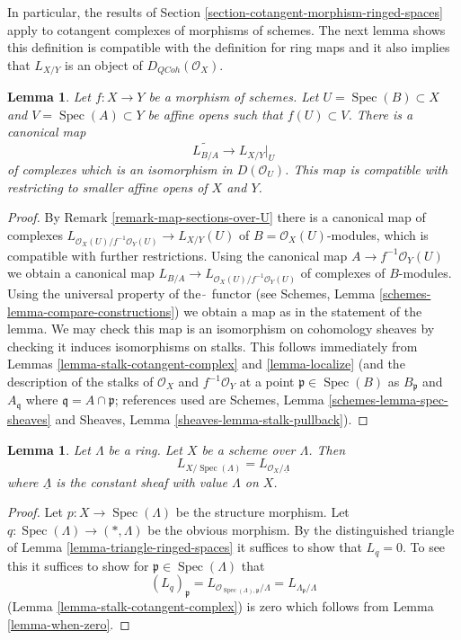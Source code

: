 \documentclass{stacks-project}
\theoremstyle{plain}
\newtheorem{lemma}[subsection]{Lemma}
\theoremstyle{definition}
\theoremstyle{remark}
\numberwithin{equation}{subsection}
\def\Spec{\mathop{\mathrm{Spec}}}
\def\QCoh{\mathit{QCoh}}
\begin{document}
\noindent
In particular, the results of
Section \ref{section-cotangent-morphism-ringed-spaces} apply
to cotangent complexes of morphisms of schemes.
The next lemma shows this definition is compatible with the definition
for ring maps and it also implies that $L_{X/Y}$ is an
object of $D_\QCoh(\mathcal{O}_X)$.

\begin{lemma}
\label{lemma-morphism-affine-schemes}
Let $f : X \to Y$ be a morphism of schemes. Let $U = \Spec(B) \subset X$
and $V = \Spec(A) \subset Y$ be affine opens such that $f(U) \subset V$.
There is a canonical map
$$
\widetilde{L_{B/A}} \longrightarrow L_{X/Y}|_U
$$
of complexes which is an isomorphism in $D(\mathcal{O}_U)$.
This map is compatible with restricting to smaller affine opens
of $X$ and $Y$.
\end{lemma}

\begin{proof}
By Remark \ref{remark-map-sections-over-U}
there is a canonical map of complexes
$L_{\mathcal{O}_X(U)/f^{-1}\mathcal{O}_Y(U)} \to L_{X/Y}(U)$
of $B = \mathcal{O}_X(U)$-modules, which is compatible
with further restrictions. Using the canonical map
$A \to f^{-1}\mathcal{O}_Y(U)$ we obtain a canonical map
$L_{B/A} \to L_{\mathcal{O}_X(U)/f^{-1}\mathcal{O}_Y(U)}$
of complexes of $B$-modules.
Using the universal property of the $\widetilde{\ }$
functor (see Schemes, Lemma \ref{schemes-lemma-compare-constructions})
we obtain a map as in the statement of the lemma.
We may check this map is an isomorphism on cohomology sheaves
by checking it induces isomorphisms on stalks.
This follows immediately from
Lemmas \ref{lemma-stalk-cotangent-complex} and \ref{lemma-localize}
(and the description of the stalks of
$\mathcal{O}_X$ and $f^{-1}\mathcal{O}_Y$
at a point $\mathfrak p \in \Spec(B)$ as $B_\mathfrak p$ and
$A_\mathfrak q$ where $\mathfrak q = A \cap \mathfrak p$; references
used are Schemes, Lemma \ref{schemes-lemma-spec-sheaves}
and
Sheaves, Lemma \ref{sheaves-lemma-stalk-pullback}).
\end{proof}

\begin{lemma}
\label{lemma-scheme-over-ring}
Let $\Lambda$ be a ring. Let $X$ be a scheme over $\Lambda$.
Then
$$
L_{X/\Spec(\Lambda)} = L_{\mathcal{O}_X/\underline{\Lambda}}
$$
where $\underline{\Lambda}$ is the constant sheaf with value
$\Lambda$ on $X$.
\end{lemma}

\begin{proof}
Let $p : X \to \Spec(\Lambda)$ be the structure morphism.
Let $q : \Spec(\Lambda) \to (*, \Lambda)$ be the obvious morphism.
By the distinguished triangle of Lemma \ref{lemma-triangle-ringed-spaces}
it suffices to show that $L_q = 0$. To see this it suffices to
show for $\mathfrak p \in \Spec(\Lambda)$ that
$$
(L_q)_\mathfrak p =
L_{\mathcal{O}_{\Spec(\Lambda), \mathfrak p}/\Lambda} =
L_{\Lambda_\mathfrak p/\Lambda}
$$
(Lemma \ref{lemma-stalk-cotangent-complex})
is zero which follows from Lemma \ref{lemma-when-zero}.
\end{proof}
\end{document}
